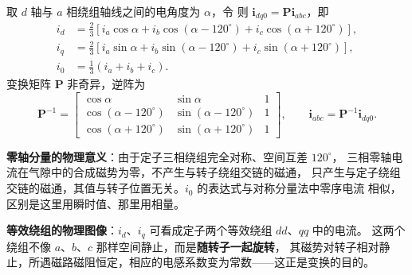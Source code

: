 取 $d$ 轴与 $a$ 相绕组轴线之间的电角度为 $\alpha$，令
则 $\boldsymbol i_{dq0}=\boldsymbol P\boldsymbol i_{abc}$，即
\begin{align}
  i_d&=\tfrac{2}{3}\left[i_a\cos\alpha+i_b\cos(\alpha-120^\circ)+i_c\cos(\alpha+120^\circ)\right],\\
  i_q&=\tfrac{2}{3}\left[i_a\sin\alpha+i_b\sin(\alpha-120^\circ)+i_c\sin(\alpha+120^\circ)\right],\\
  i_0&=\tfrac{1}{3}\left(i_a+i_b+i_c\right).
\end{align}
变换矩阵 $\boldsymbol P$ 非奇异，逆阵为
\begin{equation}
  \boldsymbol P^{-1}=
  \begin{bmatrix}
    \cos\alpha & \sin\alpha & 1\\
    \cos(\alpha-120^\circ) & \sin(\alpha-120^\circ) & 1\\
    \cos(\alpha+120^\circ) & \sin(\alpha+120^\circ) & 1
  \end{bmatrix},
  \qquad \boldsymbol i_{abc}=\boldsymbol P^{-1}\boldsymbol i_{dq0}.
\end{equation}

\textbf{零轴分量的物理意义}：由于定子三相绕组完全对称、空间互差 $120^\circ$，
三相零轴电流在气隙中的合成磁势为零，不产生与转子绕组交链的磁通，
只产生与定子绕组交链的磁通，其值与转子位置无关。$i_0$ 的表达式与对称分量法中零序电流
相似，区别是这里用瞬时值、那里用相量。

\textbf{等效绕组的物理图像}：$i_d$、$i_q$ 可看成定子两个等效绕组 $dd$、$qq$ 中的电流。
这两个绕组不像 $a$、$b$、$c$ 那样空间静止，而是\textbf{随转子一起旋转}，
其磁势对转子相对静止，所遇磁路磁阻恒定，相应的电感系数变为常数——这正是变换的目的。

